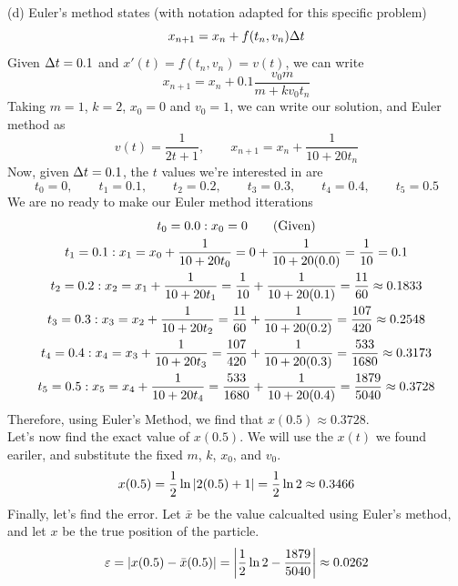 \documentclass[a4paper, 11pt]{report}
\begin{document}
\sol (d) Euler's method states (with notation adapted for this specific problem)
$$
	x_{n+1} = x_{n} + f(t_{n}, v_{n})\Delta t
$$
Given $\Delta t =0.1$ and $x'(t) = f(t_n, v_n) = v(t)$, we can write
$$
	x_{n+1} = x_{n} + 0.1\frac{v_0m}{m+kv_0t_n}
$$
Taking $m=1$, $k=2$, $x_0=0$ and $v_0=1$, we can write our solution, and Euler method as
$$
	v(t) = \frac{1}{2t + 1},\qquad x_{n+1} = x_{n} + \frac{1}{10+20t_n}
$$
Now, given $\Delta t = 0.1$, the $t$ values we're interested in are 
$$
	t_0 = 0,\qquad t_1 = 0.1,\qquad t_2 = 0.2,\qquad t_3 = 0.3,\qquad t_4 = 0.4,\qquad t_5 = 0.5 
$$
We are no ready to make our Euler method itterations
\begin{gather*}
	t_0 = 0.0: x_0 = 0 \tag*{(\text{Given})} \\
	t_1 = 0.1: x_1 = x_0 + \frac{1}{10+20t_0} = 0 + \frac{1}{10+20(0.0)} = \frac{1}{10} = 0.1 \\
	t_2 = 0.2: x_2 = x_1 + \frac{1}{10+20t_1} = \frac{1}{10} + \frac{1}{10+20(0.1)} = \frac{11}{60} \approx 0.1833 \\
	t_3 = 0.3: x_3 = x_2 + \frac{1}{10+20t_2} = \frac{11}{60} + \frac{1}{10+20(0.2)} = \frac{107}{420} \approx 0.2548 \\
	t_4 = 0.4: x_4 = x_3 + \frac{1}{10+20t_3} = \frac{107}{420} + \frac{1}{10+20(0.3)} = \frac{533}{1680} \approx 0.3173 \\
	t_5 = 0.5: x_5 = x_4 + \frac{1}{10+20t_4} = \frac{533}{1680} + \frac{1}{10+20(0.4)} = \frac{1879}{5040} \approx 0.3728 \\
\end{gather*}
Therefore, using Euler's Method, we find that $x(0.5)\approx 0.3728$. \\
Let's now find the exact value of $x(0.5)$. We will use the $x(t)$ we found eariler, and substitute the fixed $m$, $k$, $x_0$, and $v_0$.
$$
	x(0.5) = \frac{1}{2}\ln\left| 2(0.5) + 1 \right| = \frac{1}{2}\ln2 \approx 0.3466
$$
Finally, let's find the error. Let $\bar{x}$ be the value calcualted using Euler's method, and let $x$ be the true position of the particle. 
$$
	\varepsilon = \left| x(0.5) - \bar{x}(0.5) \right| = \left| \frac{1}{2}\ln2 - \frac{1879}{5040} \right| \approx 0.0262
$$
\end{document}
